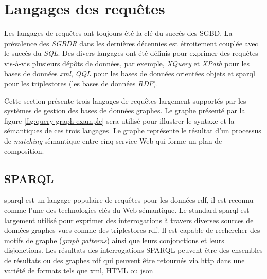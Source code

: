 

\section{Langages des requêtes}
\label{sec:query-languages}
Les langages de requêtes ont toujours été la clé du succès des
\acrshort{SGBD}. La prévalence des \emph{\acrshort{SGBDR}} dans les
dernières décennies est étroitement couplée avec le succès du
\emph{SQL}. Des divers langages ont été définis pour exprimer des
requêtes vis-à-vis plusieurs dépôts de données, par exemple,
\emph{XQuery} \cite{boag2002xquery} et \emph{XPath}
\cite{clark1999xml} pour les bases de données \emph{\acrshort{xml}},
\emph{QQL} \cite{alashqur1989oql} pour les bases de données orientées
objets et \acrshort{sparql} \cite{prud2008sparql} pour les
triplestores (les bases de données \emph{RDF}).



Cette section présente trois langages de requêtes largement supportés
par les systèmes de gestion des bases de données graphes. Le graphe
présenté par la figure \ref{fig:query-graph-example} sera utilisé pour
illustrer le syntaxe et la sémantiques de ces trois langages. Le
graphe représente le résultat d'un processus de \emph{matching}
sémantique entre cinq service Web qui forme un plan de composition.


\newpage
  \subsection{SPARQL}
  \label{sec:sparql}

  \acrshort{sparql} \cite{prud2008sparql} est un langage populaire de
  requêtes pour les données \acrshort{rdf}, il est reconnu comme l'une
  des technologies clés du Web sémantique. Le standard
  \acrshort{sparql} est largement utilisé pour exprimer des
  interrogations à travers diverses sources de données graphes vues
  comme des triplestores \acrshort{rdf}. Il est capable de rechercher
  des motifs de graphe (\emph{graph patterns}) ainsi que leurs
  conjonctions et leurs disjonctions. Les résultats des interrogations
  \textsc{SPARQL} peuvent être des ensembles de résultats ou des
  graphes \acrshort{rdf} qui peuvent être retournés via
  \acrshort{http} dans une variété de formats tels que \acrshort{xml},
  HTML ou \acrshort{json}

